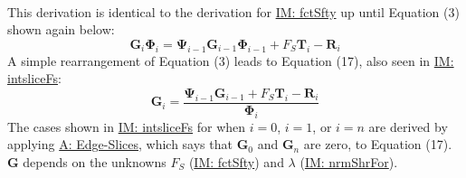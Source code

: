 \documentclass[12pt]{article}
\begin{document}
\paragraph{}
\label{IM:intsliceFsDeriv}
This derivation is identical to the derivation for \hyperref[IM:fctSfty]{IM: fctSfty} up until Equation (3) shown again below:
\begin{displaymath}
{\mathbf{G}}_{i} {\mathbf{Φ}}_{i}={\mathbf{Ψ}}_{i-1} {\mathbf{G}}_{i-1} {\mathbf{Φ}}_{i-1}+{F_{S}} {\mathbf{T}}_{i}-{\mathbf{R}}_{i}
\end{displaymath}
A simple rearrangement of Equation (3) leads to Equation (17), also seen in \hyperref[IM:intsliceFs]{IM: intsliceFs}:
\begin{displaymath}
{\mathbf{G}}_{i}=\frac{{\mathbf{Ψ}}_{i-1} {\mathbf{G}}_{i-1}+{F_{S}} {\mathbf{T}}_{i}-{\mathbf{R}}_{i}}{{\mathbf{Φ}}_{i}}
\end{displaymath}
The cases shown in \hyperref[IM:intsliceFs]{IM: intsliceFs} for when $i=0$, $i=1$, or $i=n$ are derived by applying \hyperref[assumpES]{A: Edge-Slices}, which says that ${\mathbf{G}}_{0}$ and ${\mathbf{G}}_{n}$ are zero, to Equation (17). $\mathbf{G}$ depends on the unknowns ${F_{S}}$ (\hyperref[IM:fctSfty]{IM: fctSfty}) and $λ$ (\hyperref[IM:nrmShrFor]{IM: nrmShrFor}).
\par~
\end{document}
